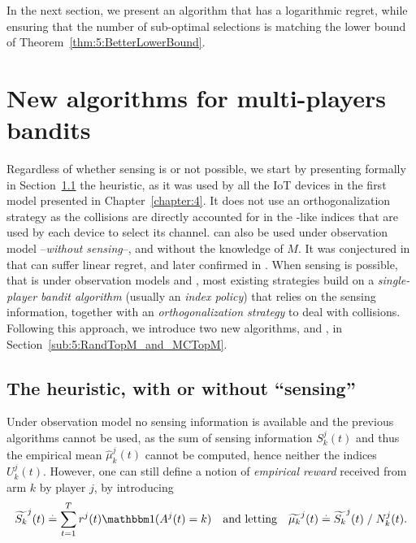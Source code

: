 In the next section, we present an algorithm that has a logarithmic regret,
while ensuring that the number of sub-optimal selections is matching the lower bound of Theorem~\ref{thm:5:BetterLowerBound}.



\section{New algorithms for multi-players bandits}
\label{sec:5:algorithms}


Regardless of whether sensing is or not possible, we start by presenting formally in Section~\ref{sub:5:Selfish} the \Selfish{} heuristic, as it was used by all the IoT devices in the first model presented in Chapter~\ref{chapter:4}.
It does not use an orthogonalization strategy as the collisions are directly accounted for in the \UCB-like indices that are used by each device to select its channel.
\Selfish{} can also be used under observation model \modeltrois{} --\emph{without sensing}--, and without the knowledge of $M$.
It was conjectured in \cite{Besson2018ALT} that \Selfish{} can suffer linear regret, and later confirmed in \cite{LugosiMehrabian18,BoursierPerchet18}.
%
When sensing is possible, that is under observation models \modelun{} and \modeldeux, most existing strategies build on a \emph{single-player bandit algorithm} (usually an \emph{index policy}) that relies on the sensing information, together with an \emph{orthogonalization strategy} to deal with collisions.
Following this approach, we introduce two new algorithms, \RandTopM{} and \MCTopM, in Section~\ref{sub:5:RandTopM_and_MCTopM}.


\subsection{The \Selfish{} heuristic, with or without ``sensing''}
\label{sub:5:Selfish}

Under observation model \modeltrois{} no sensing information is available and the previous algorithms cannot be used, as the sum of sensing information $S_k^j(t)$ and thus the empirical mean $\widehat{\mu}_k^j(t)$ cannot be computed, hence neither the indices $U_k^j(t)$. However, one can still define a notion of \emph{empirical reward} received from arm $k$ by player $j$, by introducing
%
\begin{equation}
  \widetilde{S_k}^j(t) \eqdef \sum_{t=1}^T r^j(t) \indic(A^j(t) = k)
  \ \ \ \text{and letting} \ \ \ \widetilde{\mu_k}^j(t) \eqdef \widetilde{S_k}^j(t) \;/\; N_k^j(t).
\end{equation}

